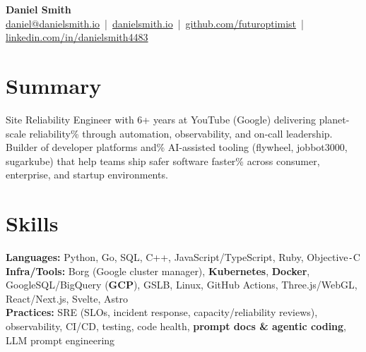 \documentclass[10pt]{article}
\begin{document}
\begin{center}
    {\LARGE \textbf{Daniel Smith}}\\[-1mm]
    \href{mailto:daniel@danielsmith.io}{daniel@danielsmith.io} \,|\, 
    \href{https://danielsmith.io}{danielsmith.io} \,|\, 
    \href{https://github.com/futuroptimist}{github.com/futuroptimist} \,|\, 
    \href{https://linkedin.com/in/danielsmith4483}{linkedin.com/in/danielsmith4483}
\end{center}

\vspace{-2mm}
\section*{Summary}
Site Reliability Engineer with 6+ years at YouTube (Google) delivering planet-scale reliability\%
through automation, observability, and on-call leadership. Builder of developer platforms and\%
AI-assisted tooling (flywheel, jobbot3000, sugarkube) that help teams ship safer software faster\%
across consumer, enterprise, and startup environments.

\vspace{-2mm}
\section*{Skills}
\textbf{Languages:} Python, Go, SQL, C++, JavaScript/TypeScript, Ruby, Objective\texttt{-}C \\
\textbf{Infra/Tools:} Borg (Google cluster manager), \textbf{Kubernetes}, \textbf{Docker}, GoogleSQL/BigQuery (\textbf{GCP}), GSLB, Linux, GitHub Actions, Three.js/WebGL, React/Next.js, Svelte, Astro \\
\textbf{Practices:} SRE (SLOs, incident response, capacity/reliability reviews), observability, CI/CD, testing, code health, \textbf{prompt docs \& agentic coding}, LLM prompt engineering

\vspace{-2mm}
\end{document}
